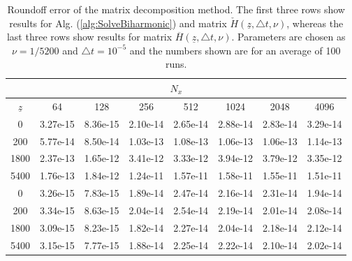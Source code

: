 \documentclass[11pt, oneside]{elsarticle}
\newcommand{\N}[1]{\check{#1}}
\newcommand{\D}[1]{\overline{#1}}
\begin{document}
\begin{table}
	\caption{ Roundoff error of the matrix decomposition method. The first three 
	rows show results for Alg. (\ref{alg:SolveBiharmonic}) and matrix $\N{H}(\underline{z}, 
	\triangle t, \nu)$, whereas the last three rows show results for matrix 
	$\D{H}(\underline{z}, \triangle t, \nu)$. Parameters 
	are chosen as $\nu=1/5200$ and $\triangle t=10^{-5}$ and the numbers shown 
	are for an average of 100 runs.	 \label{tab:roundoff}}
   \begin{tabular}{cccccccc}
	   \multicolumn{8}{c}{$N_x$} \\
	   \hline
$\underline{z}$ & 64 & 128 & 256 & 512 & 1024 & 2048 & 4096 \\ 
\hline
0 & 3.27e-15  & 8.36e-15  & 2.10e-14  & 2.65e-14  & 2.88e-14  & 2.83e-14  & 3.29e-14  \\ 
200 & 5.77e-14  & 8.50e-14  & 1.03e-13  & 1.08e-13  & 1.06e-13  & 1.06e-13  & 1.14e-13  \\ 
1800 & 2.37e-13  & 1.65e-12  & 3.41e-12  & 3.33e-12  & 3.94e-12  & 3.79e-12  & 3.35e-12  \\ 
5400 & 1.76e-13  & 1.84e-12  & 1.24e-11  & 1.57e-11  & 1.58e-11  & 1.55e-11  & 1.51e-11  \\ 
\hline
0 & 3.26e-15  & 7.83e-15  & 1.89e-14  & 2.47e-14  & 2.16e-14  & 2.31e-14  & 1.94e-14  \\ 
200 & 3.34e-15  & 8.63e-15  & 2.04e-14  & 2.54e-14  & 2.19e-14  & 2.01e-14  & 2.08e-14  \\ 
1800 & 3.09e-15  & 8.23e-15  & 1.82e-14  & 2.27e-14  & 2.04e-14  & 2.18e-14  & 2.12e-14  \\ 
5400 & 3.15e-15  & 7.77e-15  & 1.88e-14  & 2.25e-14  & 2.22e-14  & 2.10e-14  & 2.02e-14 
		
\end{tabular}
\end{table}
\end{document}
